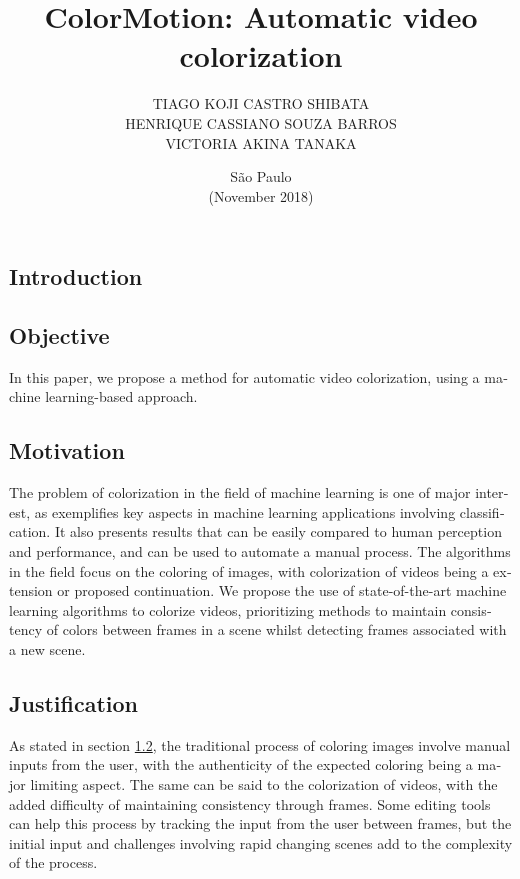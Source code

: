 \documentclass[12pt,openright,twoside,a4paper,english]{abntex2}
\author{TIAGO KOJI CASTRO SHIBATA\\
HENRIQUE CASSIANO SOUZA BARROS\\
VICTORIA AKINA TANAKA}
\title{ColorMotion: Automatic video colorization}
\date{São Paulo\\(November 2018)}
\begin{document}
\begin{otherlanguage}{english}

\imprimircapa
\imprimirfalsafolhaderosto
\imprimirfolhaderosto

\maketitle

\section{Introduction}

\subsection{Objective}
In this paper, we propose a method for automatic video colorization, using a machine learning-based approach.

\subsection{Motivation} \label{sec:Motivation}
The problem of colorization in the field of machine learning is one of major interest, as exemplifies key aspects in machine learning applications involving classification. It also presents results that can be easily compared to human perception and performance, and can be used to automate a manual process. The algorithms in the field focus on the coloring of images, with colorization of videos being a extension or proposed continuation. We propose the use of state-of-the-art machine learning algorithms to colorize videos, prioritizing methods to maintain consistency of colors between frames in a scene whilst detecting frames associated with a new scene.

\subsection{Justification}
As stated in section \ref{sec:Motivation}, the traditional process of coloring images involve manual inputs from the user, with the authenticity of the expected coloring being a major limiting aspect.
The same can be said to the colorization of videos, with the added difficulty of maintaining consistency through frames. Some editing tools can help this process by tracking the input from the user between frames, but the initial input and challenges involving rapid changing scenes add to the complexity of the process.


\end{otherlanguage}
\end{document}
